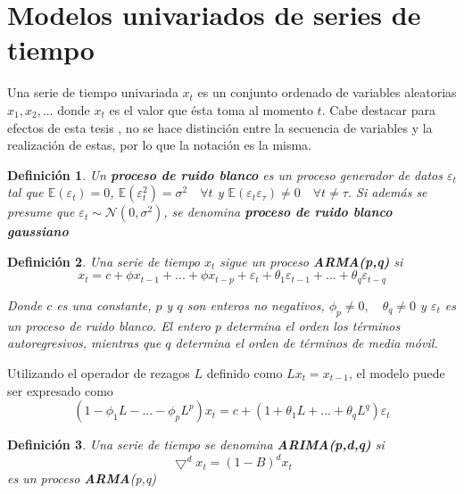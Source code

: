 \documentclass[12pt, twoside]{book}\usepackage[]{graphicx}\usepackage[]{color}
\numberwithin{equation}{section}
\numberwithin{theorem}{section}
\numberwithin{teorema}{section}
\newtheorem{defi}{Definición}
\newenvironment{defin}
      {\begin{shaded}\begin{defi}}
      {\end{defi}\end{shaded}}
\numberwithin{defi}{section}
\numberwithin{prop}{section}
\numberwithin{defi}{section}
\theoremstyle{plain}
\begin{document}
\section{Modelos univariados de series de tiempo}

Una serie de tiempo univariada $x_{t}$ es un conjunto ordenado de variables aleatorias $x_{1},x_{2},...$ donde $x_{t}$ es el valor que ésta toma al momento $t$. Cabe destacar para efectos de esta tesis , no se hace distinción entre la secuencia de variables y la realización de estas, por lo que la notación es la misma. 

\begin{defin}
Un \textbf{proceso de ruido blanco} es un proceso generador de datos $\varepsilon_{t}$ tal que $\mathbb{E}(\varepsilon_{t})=0$, $\mathbb{E}(\varepsilon_{t}^{2})=\sigma^{2}\quad \forall t$ y $\mathbb{E}(\varepsilon_{t}\varepsilon_{\tau})\neq 0\quad \forall t\neq \tau$. Si además se presume que $\varepsilon_{t}\sim \mathcal{N}(0,\sigma^{2})$, se denomina \textbf{proceso de ruido blanco gaussiano}
\end{defin}

\begin{defin}
Una serie de tiempo $x_{t}$ sigue un proceso \textbf{ARMA(p,q)} si 
\begin{equation}
x_{t}  = c +\phi x_{t-1}+...+\phi x_{t-p}+\varepsilon_{t}+\theta_{1}\varepsilon_{t-1}+...+\theta_{q}\varepsilon_{t-q}
\end{equation}

Donde $c$ es una constante, $p$ y $q$ son enteros no negativos, $\phi_{p}\neq 0,\quad \theta_{q}\neq 0$ y $\varepsilon_{t}$ es un proceso de ruido blanco. El entero $p$ determina el orden los términos autoregresivos, mientras que $q$ determina el orden de términos de media móvil.   

\end{defin}

Utilizando el operador de rezagos $L$ definido como $Lx_{t}=x_{t-1}$, el modelo puede ser expresado como 
\begin{equation}
(1-\phi_{1}L-...-\phi_{p}L^{p})x_{t} = c+(1+\theta_{1}L+...+\theta_{q}L^{q})\varepsilon_{t}
\end{equation}

\begin{defin}
Una serie de tiempo se denomina \textbf{ARIMA(p,d,q)} si 
\begin{equation}
\bigtriangledown^{d}x_{t} = (1-B)^{d}x_{t} 
\end{equation}
es un proceso \textbf{ARMA}(p,q)
\end{defin}
\end{document}

